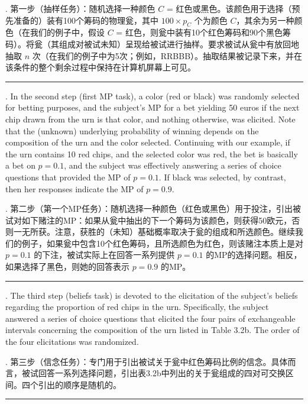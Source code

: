 \documentclass[12pt,a4paper]{article}
\newenvironment{original}
  {\par\vspace{0.5em}\noindent\color{black}\ignorespaces}
  {\par\vspace{0.3em}}
\newenvironment{translation}
  {\par\noindent\color{transblue}\ignorespaces}
  {\par\vspace{0.8em}\hrule\vspace{0.5em}}
\begin{document}
\begin{translation}
1. 第一步（抽样任务）：随机选择一种颜色 $C$ = 红色或黑色。该颜色用于选择（预先准备的）装有100个筹码的物理瓮，其中 $100 \times p_C$ 个为颜色 $C$，其余为另一种颜色（在我们的例子中，假设 $C$ = 红色，则瓮中装有10个红色筹码和90个黑色筹码）。将瓮（其组成对被试未知）呈现给被试进行抽样。要求被试从瓮中有放回地抽取 $n$ 次（在我们的例子中为5次；例如，RRBBB）。抽取结果被记录下来，并在该条件的整个剩余过程中保持在计算机屏幕上可见。
\end{translation}

\begin{original}
2. In the second step (first MP task), a color (red or black) was randomly selected for betting purposes, and the subject's MP for a bet yielding 50 euros if the next chip drawn from the urn is that color, and nothing otherwise, was elicited. Note that the (unknown) underlying probability of winning depends on the composition of the urn and the color selected. Continuing with our example, if the urn contains 10 red chips, and the selected color was red, the bet is basically a bet on $p = 0.1$, and the subject was effectively answering a series of choice questions that provided the MP of $p = 0.1$. If black was selected, by contrast, then her responses indicate the MP of $p = 0.9$.
\end{original}

\begin{translation}
2. 第二步（第一个MP任务）：随机选择一种颜色（红色或黑色）用于投注，引出被试对如下赌注的MP：如果从瓮中抽出的下一个筹码为该颜色，则获得50欧元，否则一无所获。注意，获胜的（未知）基础概率取决于瓮的组成和所选颜色。继续我们的例子，如果瓮中包含10个红色筹码，且所选颜色为红色，则该赌注本质上是对 $p = 0.1$ 的下注，被试实际上在回答一系列提供 $p = 0.1$ 的MP的选择问题。相反，如果选择了黑色，则她的回答表示 $p = 0.9$ 的MP。
\end{translation}

\begin{original}
3. The third step (beliefs task) is devoted to the elicitation of the subject's beliefs regarding the proportion of red chips in the urn. Specifically, the subject answered a series of choice questions that elicited the four pairs of exchangeable intervals concerning the composition of the urn listed in Table 3.2b. The order of the four elicitations was randomized.
\end{original}

\begin{translation}
3. 第三步（信念任务）：专门用于引出被试关于瓮中红色筹码比例的信念。具体而言，被试回答一系列选择问题，引出表3.2b中列出的关于瓮组成的四对可交换区间。四个引出的顺序是随机的。
\end{translation}
\end{document}
